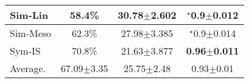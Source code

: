 \begin{table*}
\begin{subtable}[t]{0.48\textwidth}
{\begin{tabular}{|l|ccc|}
Sim-Lin    & 58.4\%                           & 30.78$\pm$2.602                         & $^{\star}${0.9$\pm$0.012}              \\ \hline
Sim-Meso   & 62.3\%                           & 27.98$\pm$3.385                         & $^{\star}${0.9$\pm$0.014}              \\ \hline
Sym-IS     & 70.8\%                           & 21.63$\pm$3.877                         & \textbf{0.96$\pm$0.011} \\ \hline
Average.   & 67.09$\pm$3.35                   & 25.75$\pm$2.48                          & 0.93$\pm$0.01    
\\\hline
\end{tabular}%
\label{tab:table1_b}
}%
\end{subtable}%

\bigskip 


\end{table*}
